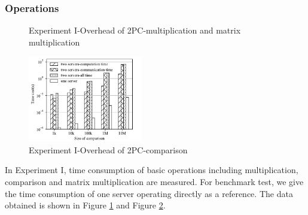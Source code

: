 \documentclass[letterpaper]{article} %
\begin{document}
    \subsubsection{Operations}
    \begin{figure}[htbp]
        \caption{Experiment I-Overhead of 2PC-multiplication and matrix multiplication}
        \label{multiplication and matrix multiplication}
    \end{figure}
    \begin{figure}[htbp]
        \centering
        \includegraphics[width=5cm]{operation_compare.pdf}
        \caption{Experiment I-Overhead of 2PC-comparison}
        \label{operation_compare}
    \end{figure}
    In Experiment I, time consumption of basic operations including multiplication, comparison and matrix multiplication are measured.
    For benchmark test, we give the time consumption of one server operating directly as a reference.
    The data obtained is shown in Figure \ref{multiplication and matrix multiplication} and Figure \ref{operation_compare}.
\end{document}

